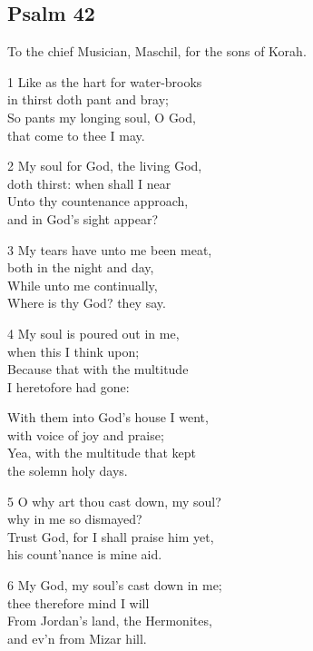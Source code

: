 \begin{center}
\Large{}
\end{center}
\begin{multicols}{3}


\subsection*{Psalm 42}

To the chief Musician, Maschil, for the sons of Korah.

1 Like as the hart for water-brooks\\
in thirst doth pant and bray;\\
So pants my longing soul, O God,\\
that come to thee I may.

2 My soul for God, the living God,\\
doth thirst: when shall I near\\
Unto thy countenance approach,\\
and in God’s sight appear?

3 My tears have unto me been meat,\\
both in the night and day,\\
While unto me continually,\\
Where is thy God? they say.

4 My soul is poured out in me,\\
when this I think upon;\\
Because that with the multitude\\
I heretofore had gone:

With them into God’s house I went,\\
with voice of joy and praise;\\
Yea, with the multitude that kept\\
the solemn holy days.

5 O why art thou cast down, my soul?\\
why in me so dismayed?\\
Trust God, for I shall praise him yet,\\
his count’nance is mine aid.

6 My God, my soul’s cast down in me;\\
thee therefore mind I will\\
From Jordan’s land, the Hermonites,\\
and ev’n from Mizar hill.


\end{multicols}
